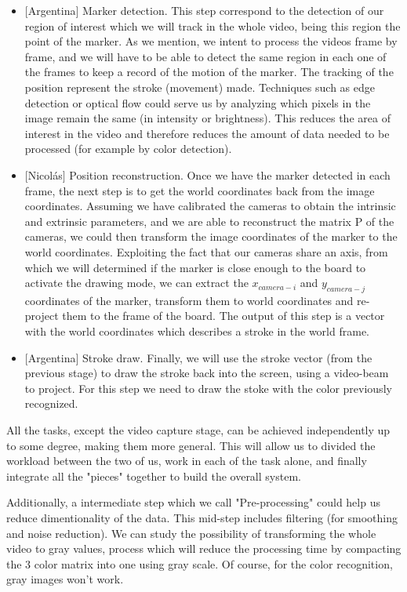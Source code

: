 \documentclass[a4paper,12pt]{article}
\begin{document}
\begin{itemize}
    \item $[$Argentina$]$ Marker detection. This step correspond to the detection of our region of interest which we will track in the whole video, being this region the point of the marker. As we mention, we intent to process the videos frame by frame, and we will have to be able to detect the same region in each one of the frames to keep a record of the motion of the marker. The tracking of the position represent the stroke (movement) made. Techniques such as edge detection or optical flow could serve us by analyzing which pixels in the image remain the same (in intensity or brightness). This reduces the area of interest in the video and therefore reduces the amount of data needed to be processed (for example by color detection).
    \item $[$Nicolás$]$ Position reconstruction. Once we have the marker detected in each frame, the next step is to get the world coordinates back from the image coordinates. Assuming we have calibrated the cameras to obtain the intrinsic and extrinsic parameters, and we are able to reconstruct the matrix P of the cameras, we could then transform the image coordinates of the marker to the world coordinates. Exploiting the fact that our cameras share an axis, from which we will determined if the marker is close enough to the board to activate the drawing mode, we can extract the $x_{camera-i}$ and $y_{camera-j}$ coordinates of the marker, transform them to world coordinates and re-project them to the frame of the board. The output of this step is a vector with the world coordinates which describes a stroke in the world frame.
    \item $[$Argentina$]$ Stroke draw. Finally, we will use the stroke vector (from the previous stage) to draw the stroke back into the screen, using a video-beam to project. For this step we need to draw the stoke with the color previously recognized.
\end{itemize}

All the tasks, except the video capture stage, can be achieved independently up to some degree, making them more general. This will allow us to divided the workload between the two of us, work in each of the task alone, and finally integrate all the "pieces" together to build the overall system.


Additionally, a intermediate step which we call "Pre-processing" could help us reduce dimentionality of the data. This mid-step includes filtering (for smoothing and noise reduction). We can study the possibility of transforming the whole video to gray values, process which will reduce the processing time by compacting the 3 color matrix into one using gray scale. Of course, for the color recognition, gray images won't work.
\end{document}
